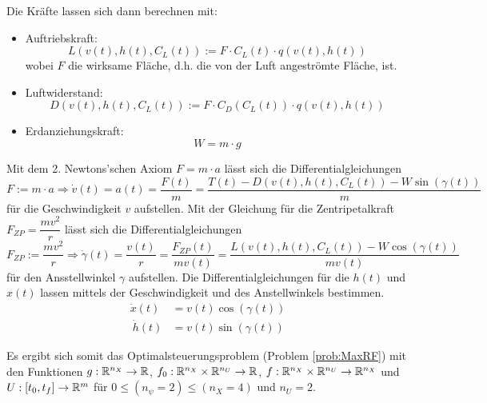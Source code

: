 Die Kräfte lassen sich dann berechnen mit:
\begin{itemize}
    \item Auftriebskraft: \[L(v(t), h(t), C_L(t)) := F \cdot C_L(t) \cdot q(v(t), h(t))\] wobei $F$ die wirksame Fläche, d.h. die von der Luft angeströmte Fläche, ist.
    \item Luftwiderstand: \[D(v(t), h(t), C_L(t)) := F \cdot C_D(C_L(t)) \cdot q(v(t), h(t))\]
    \item Erdanziehungskraft: \[W = m \cdot g\]
\end{itemize}

Mit dem 2. Newtons'schen Axiom $F = m \cdot a$ lässt sich die Differentialgleichungen
\[F := m \cdot a \Rightarrow \dot{v}(t) = a(t) = \dfrac{F(t)}{m} = \dfrac{T(t) - D(v(t),h(t),C_L(t)) - W \sin(\gamma(t))}{m}\]
für die Geschwindigkeit $v$ aufstellen.
Mit der Gleichung für die Zentripetalkraft $F_{ZP} = \dfrac{m v^2}{r}$ lässt sich die Differentialgleichungen
\[F_{ZP} := \dfrac{m v^2}{r} \Rightarrow \dot{\gamma}(t) = \dfrac{v(t)}{r} = \dfrac{F_{ZP}(t)}{m v(t)} = \dfrac{L(v(t),h(t),C_L(t)) - W \cos(\gamma(t))}{m v(t)}\]
für den Ansstellwinkel $\gamma$ aufstellen.
Die Differentialgleichungen für die $h(t)$ und $x(t)$ lassen mittels der Geschwindigkeit und des Anstellwinkels bestimmen.
\[\begin{split}
    \dot{x}(t) &= v(t) \cos(\gamma(t))\\\
    \dot{h}(t) &= v(t) \sin(\gamma(t))
\end{split} \]

Es ergibt sich somit das Optimalsteuerungsproblem (Problem \ref{prob:MaxRF}) mit den Funktionen $g : \mathbb{R}^{n_X} \to \mathbb{R}$, $f_0 : \mathbb{R}^{n_X} \times \mathbb{R}^{n_U} \to \mathbb{R}$, $f : \mathbb{R}^{n_X} \times \mathbb{R}^{n_U} \to \mathbb{R}^{n_X}$ und $U : [t_0,t_f] \to \mathbb{R}^m$ für $0 \leq (n_{\psi} = 2) \leq (n_X = 4)$ und $n_U = 2$.

